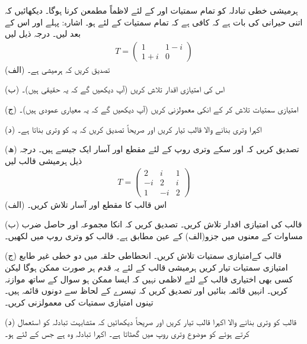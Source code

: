 ہرمیشی خطی تبادلہ کو تمام سمتیات  اور  کے لئے لاظماً  مطمعن کرنا ہوگا۔ دیکھائیں کہ اتنی حیرانی کی بات ہے کہ کافی ہے کہ تمام سمتیات  کے لئے  ہو۔ اشارہ: پہلے  اور اس کے بعد  لیں۔ 
درجہ ذیل لیں
\begin{align*}
	T=
	\begin{pmatrix}
		1 & 1-i\\
		1+i & 0
	\end{pmatrix}
\end{align*}
(الف) تصدیق کریں کہ  ہرمیشی ہے۔

(ب) اس کی امتیازی اقدار تلاش کریں (آپ دیکھیں گے کہ یہ حقیقی ہیں)۔

(ج) امتیازی سمتیات تلاش کر کے انکی معمولزنی کریں (آپ دیکھیں گے کہ یہ معیاری عمودی ہیں)۔

(د) اکہرا وتری بنانے والا قالب  تیار کریں اور صریحاً تصدیق کریں کہ یہ  کو وتری بناتا ہے۔

(ھ) تصدیق کریں کہ  اور سکے وتری روپ کے لئے مقطع  اور آسار  ایک جیسے ہیں۔
درجہ ذیل ہرمیشی قالب لیں
\begin{align*}
	T=
	\begin{pmatrix}
		2 & i & 1\\
		-i & 2 & i\\
		1 & -i & 2
	\end{pmatrix}
\end{align*}
(الف) اس قالب کا مقطع  اور آسار  تلاش کریں۔

(ب) قالب  کی امتیازی اقدار تلاش کریں۔ تصدیق کریں کہ انکا مجموعہ اور حاصل ضرب مساوات  کے معنوں میں جزو(الف) کے عین مطابق ہے۔ قالب  کو وتری روپ میں لکھیں۔

(ج) قالب  کےامتیازی سمتیات تلاش کریں۔ انحطاطی حلقہ میں دو خطی غیر طابع امتیازی سمتیات تیار کریں ہرمیشی قالب کے لئے یہ قدم ہر صورت ممکن ہوگا لیکن کسی بھی اختیاری قالب کے لئے لاظمی نہیں کہ ایسا ممکن ہو سوال  کے ساتھ موازنہ کریں۔ انہیں قائمہ بنائیں اور تصدیق کریں کہ تیسرے کے لحاظ سے دونوں قائمہ ہیں۔ تینوں امتیازی سمتیات کی معمولزنی کریں۔

(د) قالب  کو وتری بنانے والا اکہرا قالب  تیار کریں اور صریحاً دیکھائیں کہ متشابہت تبادلہ  کو استعمال کرتے ہوئے  کو موضوع وتری روپ میں گھٹاتا ہے۔
اکہرا تبادلہ وہ ہے جس کے لئے  ہو۔

